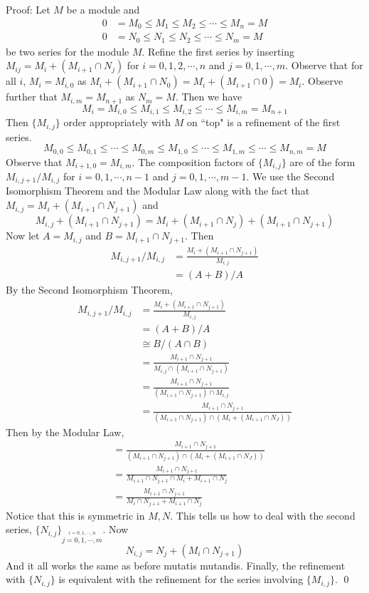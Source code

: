 Proof: Let $M$ be a module and
\[
\begin{split}
0&=M_0 \leq M_1 \leq M_2 \leq \cdots \leq M_n=M \\
0&=N_0 \leq N_1 \leq N_2 \leq \cdots \leq N_m=M
\end{split}
\]
be two series for the module $M$. Refine the first series by inserting $M_{ij}=M_i+(M_{i+1} \cap N_j)$ for $i=0,1,2,\cdots,n$ and $j=0,1,\cdots,m$. Observe that for all $i$, $M_i=M_{i,0}$ as $M_i+(M_{i+1} \cap N_0)=M_i+(M_{i+1} \cap 0)=M_i$. Observe further that $M_{i,m}=M_{n+1}$ as $N_m=M$. Then we have
\[
M_i=M_{i,0} \leq M_{i,1} \leq M_{i,2} \leq \cdots \leq M_{i,m}=M_{n+1}
\]
Then $\{M_{i,j}\}$ order appropriately with $M$ on ``top" is a refinement of the first series. 
\[
M_{0,0} \leq M_{0,1} \leq \cdots \leq M_{0,m} \leq M_{1,0} \leq \cdots \leq M_{1,m} \leq \cdots \leq M_{n,m}=M
\]
Observe that $M_{i+1,0}=M_{i,m}$. The composition factors of $\{M_{i,j}\}$ are of the form $M_{i,j+1}/M_{i,j}$ for $i=0,1,\cdots,n-1$ and $j=0,1,\cdots,m-1$. We use the Second Isomorphism Theorem and the Modular Law along with the fact that $M_{i,j}=M_i+(M_{i+1} \cap N_{j+1})$ and 
\[
M_{i,j}+(M_{i+1} \cap N_{j+1})=M_i+(M_{i+1} \cap N_j)+(M_{i+1} \cap N_{j+1})
\]
Now let $A=M_{i,j}$ and $B=M_{i+1} \cap N_{j+1}$. Then 
\[
\begin{split}
M_{i,j+1}/M_{i,j} &= \frac{M_i+(M_{i+1} \cap N_{j+1})}{M_{i,j}} \\
&=(A+B)/A 
\end{split}
\]
By the Second Isomorphism Theorem,
\[
\begin{split}
M_{i,j+1}/M_{i,j} &= \frac{M_i+(M_{i+1} \cap N_{j+1})}{M_{i,j}} \\
&=(A+B)/A \\
&\cong B/(A \cap B ) \\ 
&=\frac{M_{i+1}\cap N_{j+1}}{M_{i,j} \cap (M_{i+1}\cap N_{j+1})} \\
&=\frac{M_{i+1} \cap N_{j+1}}{(M_{i+1}\cap N_{j+1})\cap M_{i,j}} \\
&=\frac{M_{i+1} \cap N_{j+1}}{(M_{i+1} \cap N_{j+1}) \cap (M_i+(M_{i+1} \cap N_J))}
\end{split}
\]
Then by the Modular Law,
\[
\begin{split}
&=\frac{M_{i+1} \cap N_{j+1}}{(M_{i+1} \cap N_{j+1}) \cap (M_i+(M_{i+1} \cap N_J))} \\
&=\frac{M_{i+1} \cap N_{j+1}}{M_{i+1} \cap N_{j+1} \cap M_i+M_{i+1} \cap N_j} \\
&=\frac{M_{i+1} \cap N_{j+1}}{M_i \cap N_{j+1} + M_{i+1} \cap N_j}
\end{split}
\]
Notice that this is symmetric in $M,N$. This tells us how to deal with the second series, $\{N_{i,j}\}_{\stackrel{i=0,1,\cdots,n}{j=0,1,\cdots,m}}$. Now 
\[
N_{i,j}=N_j+(M_i \cap N_{j+1})
\]
And it all works the same as before mutatis mutandis. Finally, the refinement with $\{N_{i,j}\}$ is equivalent with the refinement for the series involving $\{M_{i,j}\}$. \qed \\

